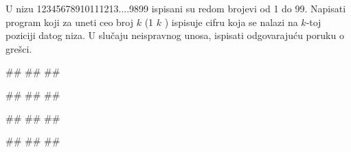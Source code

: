 \begin{Exercise}[label=KT_NG_21] 
 U nizu 12345678910111213....9899 ispisani su redom brojevi od 1 do 99. Napisati program koji za uneti 
 ceo broj $k$ (1 \leq $k$ ) ispisuje cifru koja se nalazi na $k$-toj poziciji datog niza.
 U slučaju neispravnog unosa, ispisati odgovarajuću poruku o grešci.
 
\begin{miditest}
\begin{upotreba}{1}
#\naslovInt#
##
##
\end{upotreba}
\end{miditest}
\begin{miditest}
\begin{upotreba}{2}
#\naslovInt#
##
##
\end{upotreba}
\end{miditest}

\begin{miditest}
\begin{upotreba}{3}
#\naslovInt#
##
##
\end{upotreba}
\end{miditest}
\begin{miditest}
\begin{upotreba}{4}
#\naslovInt#
##
##
\end{upotreba}
\end{miditest}

\end{Exercise}
\ifresenja
 \begin{Answer}[ref=KT_NG_21]
\end{Answer}
\fi


